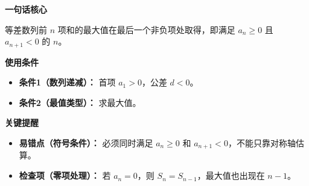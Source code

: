 \begin{summarybox}

	\textbf{\textcolor{CSummary}{一句话核心}}

	等差数列前 $n$ 项和的最大值在最后一个非负项处取得，即满足 $a_n\ge 0$ 且 $a_{n+1}<0$ 的 $n$。

	\medskip
	\textbf{\textcolor{CSummary}{使用条件}}
	\begin{itemize}[leftmargin=*, itemsep=0.5em, topsep=0.4em]
		\item \textbf{条件1（数列递减）：} 首项 $a_1>0$，公差 $d<0$。
		\item \textbf{条件2（最值类型）：} 求最大值。
	\end{itemize}

	\medskip
	\textbf{\textcolor{CSummary}{关键提醒}}
	\begin{itemize}[leftmargin=*, itemsep=0.5em, topsep=0.4em]
		\item \textbf{易错点（符号条件）：} 必须同时满足 $a_n\ge 0$ 和 $a_{n+1}<0$，不能只靠对称轴估算。
		\item \textbf{检查项（零项处理）：} 若 $a_n=0$，则 $S_n=S_{n-1}$，最大值也出现在 $n-1$。
	\end{itemize}

\end{summarybox}
